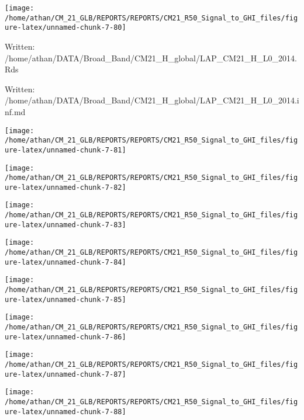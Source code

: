 \documentclass[
  11pt,
  a4paper,oneside]{article}
\begin{document}
\begin{center}\texttt{[image: /home/athan/CM\_21\_GLB/REPORTS/REPORTS/CM21\_R50\_Signal\_to\_GHI\_files/figure-latex/unnamed-chunk-7-80]} \end{center}

Written: /home/athan/DATA/Broad\_Band/CM21\_H\_global/LAP\_CM21\_H\_L0\_2014.Rds

Written: /home/athan/DATA/Broad\_Band/CM21\_H\_global/LAP\_CM21\_H\_L0\_2014.inf.md

\begin{center}\texttt{[image: /home/athan/CM\_21\_GLB/REPORTS/REPORTS/CM21\_R50\_Signal\_to\_GHI\_files/figure-latex/unnamed-chunk-7-81]} \end{center}

\begin{center}\texttt{[image: /home/athan/CM\_21\_GLB/REPORTS/REPORTS/CM21\_R50\_Signal\_to\_GHI\_files/figure-latex/unnamed-chunk-7-82]} \end{center}

\begin{center}\texttt{[image: /home/athan/CM\_21\_GLB/REPORTS/REPORTS/CM21\_R50\_Signal\_to\_GHI\_files/figure-latex/unnamed-chunk-7-83]} \end{center}

\begin{center}\texttt{[image: /home/athan/CM\_21\_GLB/REPORTS/REPORTS/CM21\_R50\_Signal\_to\_GHI\_files/figure-latex/unnamed-chunk-7-84]} \end{center}

\begin{center}\texttt{[image: /home/athan/CM\_21\_GLB/REPORTS/REPORTS/CM21\_R50\_Signal\_to\_GHI\_files/figure-latex/unnamed-chunk-7-85]} \end{center}

\begin{center}\texttt{[image: /home/athan/CM\_21\_GLB/REPORTS/REPORTS/CM21\_R50\_Signal\_to\_GHI\_files/figure-latex/unnamed-chunk-7-86]} \end{center}

\begin{center}\texttt{[image: /home/athan/CM\_21\_GLB/REPORTS/REPORTS/CM21\_R50\_Signal\_to\_GHI\_files/figure-latex/unnamed-chunk-7-87]} \end{center}

\begin{center}\texttt{[image: /home/athan/CM\_21\_GLB/REPORTS/REPORTS/CM21\_R50\_Signal\_to\_GHI\_files/figure-latex/unnamed-chunk-7-88]} \end{center}
\end{document}
